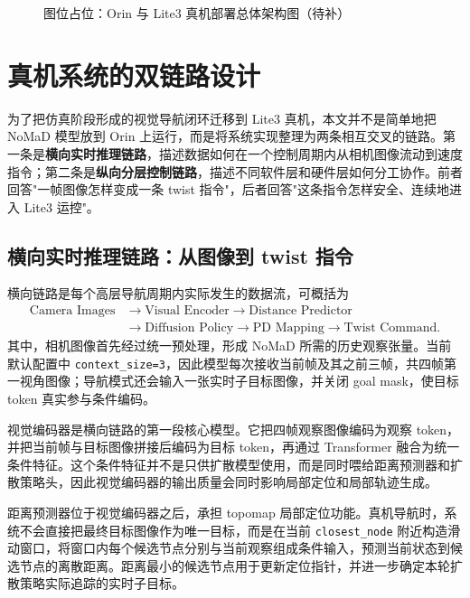 \begin{figure}[htbp]
    \centering
    \fbox{\rule{0pt}{58mm}\rule{0.86\linewidth}{0pt}}
    \caption{图位占位：Orin 与 Lite3 真机部署总体架构图（待补）}
    \label{fig:real-overview-placeholder}
\end{figure}

\section{真机系统的双链路设计}

为了把仿真阶段形成的视觉导航闭环迁移到 Lite3 真机，本文并不是简单地把 NoMaD 模型放到 Orin 上运行，而是将系统实现整理为两条相互交叉的链路。第一条是\textbf{横向实时推理链路}，描述数据如何在一个控制周期内从相机图像流动到速度指令；第二条是\textbf{纵向分层控制链路}，描述不同软件层和硬件层如何分工协作。前者回答"一帧图像怎样变成一条 twist 指令"，后者回答"这条指令怎样安全、连续地进入 Lite3 运控"。

\subsection{横向实时推理链路：从图像到 twist 指令}

横向链路是每个高层导航周期内实际发生的数据流，可概括为
\begin{equation}
\begin{aligned}
\text{Camera Images} &\rightarrow \text{Visual Encoder}
\rightarrow \text{Distance Predictor} \\
&\rightarrow \text{Diffusion Policy}
\rightarrow \text{PD Mapping}
\rightarrow \text{Twist Command}.
\end{aligned}
\end{equation}
其中，相机图像首先经过统一预处理，形成 NoMaD 所需的历史观察张量。当前默认配置中 \texttt{context\_size=3}，因此模型每次接收当前帧及其之前三帧，共四帧第一视角图像；导航模式还会输入一张实时子目标图像，并关闭 goal mask，使目标 token 真实参与条件编码。

视觉编码器是横向链路的第一段核心模型。它把四帧观察图像编码为观察 token，并把当前帧与目标图像拼接后编码为目标 token，再通过 Transformer 融合为统一条件特征。这个条件特征并不是只供扩散模型使用，而是同时喂给距离预测器和扩散策略头，因此视觉编码器的输出质量会同时影响局部定位和局部轨迹生成。

距离预测器位于视觉编码器之后，承担 topomap 局部定位功能。真机导航时，系统不会直接把最终目标图像作为唯一目标，而是在当前 \texttt{closest\_node} 附近构造滑动窗口，将窗口内每个候选节点分别与当前观察组成条件输入，预测当前状态到候选节点的离散距离。距离最小的候选节点用于更新定位指针，并进一步确定本轮扩散策略实际追踪的实时子目标。

